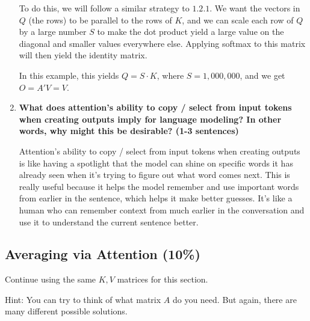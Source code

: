 \documentclass{article}
\begin{document}
\begin{enumerate}
    To do this, we will follow a similar strategy to $1.2.1$. We want the
    vectors in $Q$ (the rows) to be parallel to the rows of $K$, and we can
    scale each row of $Q$ by a large number $S$ to make the dot product yield a
    large value on the diagonal and smaller values everywhere else. Applying
    softmax to this matrix will then yield the identity matrix.

    In this example, this yields $\boxed{Q = S \cdot K}$, where $S = 1,000,000$,
    and we get $O = A' V = V$.

    \item \textbf{What does attention's ability to copy / select from input
    tokens when creating outputs imply for language modeling? In other words,
    why might this be desirable? (1-3 sentences)}

    Attention's ability to copy / select from input tokens when creating outputs
    is like having a spotlight that the model can shine on specific words it has
    already seen when it's trying to figure out what word comes next. This is
    really useful because it helps the model remember and use important words
    from earlier in the sentence, which helps it make better guesses. It's like
    a human who can remember context from much earlier in the conversation and
    use it to understand the current sentence better.

\end{enumerate}

\subsection{Averaging via Attention (10\%)}

Continue using the same $K, V$ matrices for this section.

Hint: You can try to think of what matrix $A$ do you need. But again, there are
many different possible solutions.
\end{document}
